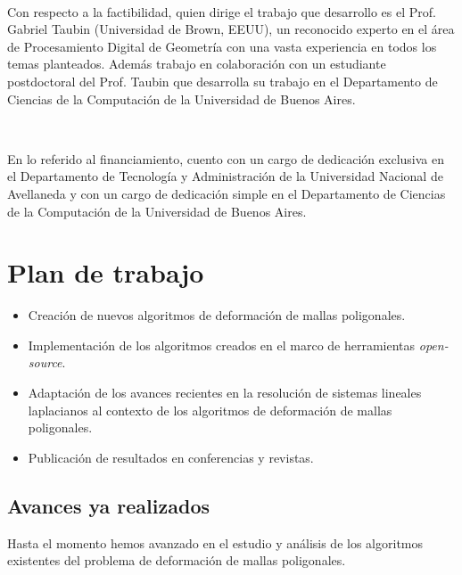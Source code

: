 \documentclass{article}
\begin{document}
\

Con respecto a la factibilidad, quien dirige el trabajo que desarrollo es 
el Prof. Gabriel Taubin (Universidad de Brown, EEUU), un reconocido experto 
en el área de Procesamiento Digital de Geometría con una vasta experiencia 
en todos los temas planteados. Además trabajo en colaboración 
con un estudiante postdoctoral del Prof. Taubin que desarrolla su trabajo 
en el Departamento de Ciencias de la Computación de la Universidad de Buenos 
Aires.


\

En lo referido al financiamiento, cuento con un cargo de dedicación exclusiva 
en el Departamento de Tecnología y Administración de la Universidad Nacional 
de Avellaneda y con un cargo de dedicación simple en el Departamento de Ciencias 
de la Computación de la Universidad de Buenos Aires.

\section{Plan de trabajo}

\begin{itemize}

\item Creación de nuevos algoritmos de deformación de mallas poligonales.

\item Implementación de los algoritmos creados en el marco de herramientas 
\emph{open-source}.

\item Adaptación de los avances recientes en la resolución de sistemas lineales 
laplacianos al contexto de los algoritmos de deformación de mallas poligonales.

\item Publicación de resultados en conferencias y revistas.

\end{itemize}

\subsection{Avances ya realizados}

Hasta el momento hemos avanzado en el estudio y análisis de los algoritmos 
existentes del problema de deformación de mallas poligonales.

\
\end{document}

